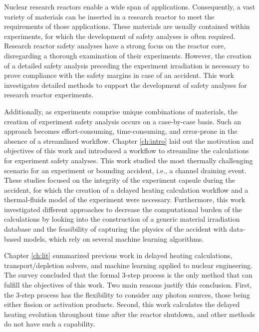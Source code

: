 \label{ch:concl}


Nuclear research reactors enable a wide span of applications.
Consequently, a vast variety of materials can be inserted in a research reactor to meet the requirements of those applications.
These materials are usually contained within experiments, for which the development of safety analyses is often required.
Research reactor safety analyses have a strong focus on the reactor core, disregarding a thorough examination of their experiments.
However, the creation of a detailed safety analysis preceding the experiment irradiation is necessary to prove compliance with the safety margins in case of an accident.
This work investigates detailed methods to support the development of safety analyses for research reactor experiments.

Additionally, as experiments comprise unique combinations of materials, the creation of experiment safety analysis occurs on a case-by-case basis.
Such an approach becomes effort-consuming, time-consuming, and error-prone in the absence of a streamlined workflow.
Chapter \ref{ch:intro} laid out the motivation and objectives of this work and introduced a workflow to streamline the calculations for experiment safety analyses.
This work studied the most thermally challenging scenario for an experiment or bounding accident, i.e., a channel draining event.
These studies focused on the integrity of the experiment capsule during the accident, for which the creation of a delayed heating calculation workflow and a thermal-fluids model of the experiment were necessary.
Furthermore, this work investigated different approaches to decrease the computational burden of the calculations by looking into the construction of a generic material irradiation database and the feasibility of capturing the physics of the accident with data-based models, which rely on several machine learning algorithms.


Chapter \ref{ch:lit} summarized previous work in delayed heating calculations, transport/depletion solvers, and machine learning applied to nuclear engineering.
The survey concluded that the formal 3-step process is the only method that can fulfill the objectives of this work.
Two main reasons justify this conclusion.
First, the 3-step process has the flexibility to consider any photon sources, those being either fission or activation products.
Second, this work calculates the delayed heating evolution throughout time after the reactor shutdown, and other methods do not have such a capability.

